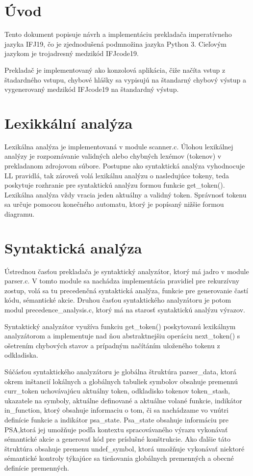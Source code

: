 \documentclass{article}
\begin{document}
	\section{Úvod}
	\large{Tento dokument popisuje návrh a implementáciu prekladača imperatívneho jazyka IFJ19, čo je zjednodušená podmnožina jazyka Python 3. Cieľovým jazykom je trojadresný medzikód IFJcode19. 
	
	Prekladač je implementovaný ako konzolová aplikácia, čiže načíta vstup z štadardného vstupu, chybové hlášky sa vypisujú na štandarný chybový výstup a vygenerovaný medzikód IFJcode19 na štandardný výstup.}
	\newpage
	\section{Lexikkální analýza}
	Lexikálna analýza je implementovaná v module scanner.c. Úlohou lexikálnej analýzy je rozpoznávanie validných alebo chybných lexémov (tokenov) v prekladanom zdrojovom súbore. Postupne ako syntaktická analýza vyhodnocuje LL pravidlá, tak zároveň volá lexikálnu analýzu o nasledujúce tokeny, teda poskytuje rozhranie pre syntaktickú analýzu formou funkcie get\_token().
	Lexikálna analýza vždy vracia jeden aktuálny a validný token. Správnosť tokenu sa určuje pomocou konečného automatu, ktorý je popísaný nižšie formou diagramu.

	\section{Syntaktická analýza}
	Ústrednou časťou prekladača je syntaktický analyzátor, ktorý má jadro v module parser.c. V tomto module sa nachádza implementácia pravidiel pre rekurzívny zostup, volá sa tu precedenčná syntaktická analýza, funkcie pre generovanie častí kódu, sémantické akcie. Druhou časťou  syntaktického analyzátoru je potom modul precedence\_analysis.c, ktorý má na starosť syntaktickú analýzu výrazov.
	
	Syntaktický analyzátor využíva funkciu get\_token() poskytovanú lexikálnym analyzátorom a implementuje nad ňou abstraktnejšiu operáciu next\_token() s ošetrením chybových stavov a prípadným načítáním uloženého tokenu z odkladiska.
	
	Súčásťou syntaktického analyzátoru je globálna štruktúra parser\_data, ktorá okrem inštancií lokálnych a globálnych tabuliek symbolov obsahuje premennú curr\_token uchovávajúcu  aktuálny token, odkladisko tokenov token\_stash, ukazatele na symboly, aktuálne definované a aktuálne volané funkcie, indikátor in\_function, ktorý obsahuje informaciu o tom, či sa nachádzame vo vnútri definície funkcie a indikátor psa\_state. Psa\_state obsahuje informáciu pre PSA,ktorá jej umožňuje podľa kontextu spracovávaného výrazu vykonávať sémantické akcie a generovať kód pre príslušné konštrukcie. Ako ďalšie táto štruktúra obsahuje premenu undef\_symbol, ktorá umožňuje vykonávať niektoré sémantické kontroly týkajúce sa tieňovania globálnych premenných a obecné definície premenných.
	
\end{document}
